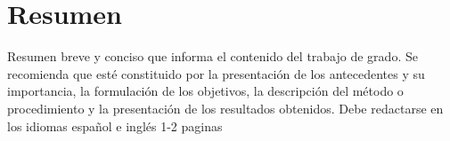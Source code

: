 \chapter{Resumen}

Resumen breve y conciso que informa el contenido
del trabajo de grado. Se recomienda que esté
constituido por la presentación de los antecedentes
y su importancia, la formulación de los objetivos, la
descripción del método o procedimiento y la
presentación de los resultados obtenidos.
Debe redactarse en los idiomas español e inglés
1-2 paginas
